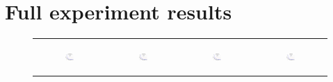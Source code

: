 \section{Full experiment results}
\label{app:exptresults}
\begin{figure}[ht]
  \centering
  \begin{tabular}{cccc}
	  \begin{subfigure}[b]{0.22\textwidth}
	  	\includegraphics[width=105pt]{images/runtime_bigsynthetic_maxgraphcut.pdf}
			\caption{}
			\label{appfig:runtime_bigsynthetic_maxgraphcut}
	  \end{subfigure} &
	  \begin{subfigure}[b]{0.22\textwidth}
	  	\includegraphics[width=105pt]{images/runtime_bigsynthetic_setcover.pdf}
			\caption{}
			\label{appfig:runtime_bigsynthetic_setcover}
	  \end{subfigure} &
	  \begin{subfigure}[b]{0.22\textwidth}
	  	\includegraphics[width=105pt]{images/runtime_zigzag_maxgraphcut.pdf}
			\caption{}
			\label{appfig:runtime_zigzag_maxgraphcut}
	  \end{subfigure} &
	  \begin{subfigure}[b]{0.22\textwidth}
	  	\includegraphics[width=105pt]{images/runtime_zigzag_setcover.pdf}

\end{subfigure}
\end{tabular}
\end{figure}
